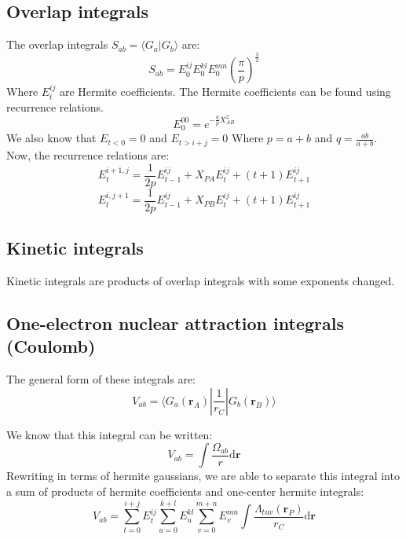 \documentclass[a4paper,10pt, twocolumn, pre]{revtex4}
\newcommand{\rvec}{\mathbf{r}}
\newcommand{\dd}{\mathrm{d}}
\newcommand{\overlap}[2]{\langle {#1}|{#2} \rangle}
\newcommand{\sandwich}[3]{\langle {#1}|{#2}|{#3}\rangle}
\begin{document}
\subsection{Overlap integrals}
The overlap integrals $S_{ab} = \overlap{G_a}{G_b}$ are:
\begin{equation}
	S_{ab} = E_0^{ij}E_0^{kl}E_0^{mn}\left(\frac{\pi}{p}\right)^{\frac{3}{2}}
\end{equation}
Where $E_t^{ij}$ are Hermite coefficients. 
The Hermite coefficients can be found using recurrence relations. 
\begin{equation}
	E_0^{00} = e^{-\frac{q}{p}X_{AB}^2}
\end{equation}
We also know that $E_{t<0} = 0$ and $E_{t>i+j} = 0$
Where $p = a+b$ and $q = \frac{ab}{a+b}$.
Now, the recurrence relations are:
\begin{equation}
	E_t^{i+1,j} = \frac{1}{2p}E_{t-1}^{ij} + X_{PA}E_t^{ij} + (t+1) E_{t+1}^{ij}
\end{equation}
\begin{equation}
	E_t^{i, j+1} = \frac{1}{2p}E_{t-1}^{ij}+X_{PB}E_t^{ij} + (t+1)E_{t+1}^{ij}
\end{equation}

\subsection{Kinetic integrals}

Kinetic integrals are products of overlap integrals with some exponents changed.

\subsection{One-electron nuclear attraction integrals (Coulomb)}
The general form of these integrals are:
\begin{equation}
	V_{ab} = \sandwich{G_a(\rvec_A)}{\frac{1}{r_C}}{G_b(\rvec_B)}
\end{equation}

We know that this integral can be written:
\begin{equation}
	V_{ab} = \int \frac{\Omega_{ab}}{r}\dd \rvec  
\end{equation}
Rewriting in terms of hermite gaussians, we are able to separate this integral into a sum of products of hermite coefficients and one-center hermite integrals:
\begin{equation}
	V_{ab} = \sum_{t=0}^{i+j}E_{t}^{ij}\sum_{u=0}^{k+l}E_{u}^{kl}\sum_{v=0}^{m+n}E_{v}^{mn} \int \frac{\Lambda_{tuv}(\rvec_P)}{r_C} \dd \rvec
\end{equation}
\end{document}
